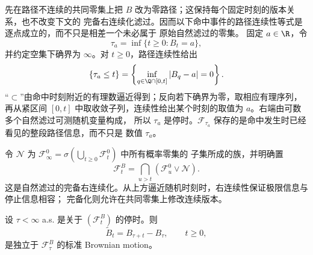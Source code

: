 \begin{example}
先在路径不连续的共同零集上把 $B$ 改为零路径；这保持每个固定时刻的版本关系，也不改变下文的
完备右连续化滤过。因而以下命中事件的路径连续性等式是逐点成立的，而不只是相差一个未必属于
原始自然滤过的零集。
固定 $a\in\R$，令
\[
 \tau_a=\inf\{t\ge0:B_t=a\},
\]
并约定空集下确界为 $\infty$。对 $t\ge0$，路径连续性给出
\[
 \{\tau_a\le t\}
 =\left\{\inf_{q\in\Q\cap[0,t]}|B_q-a|=0\right\}.
\]
“$\subset$”由命中时刻附近的有理数逼近得到；反向若下确界为零，取相应有理序列，再从紧区间
$[0,t]$ 中取收敛子列，连续性给出某个时刻的取值为 $a$。右端由可数多个自然滤过可测随机变量构成，
所以 $\tau_a$ 是停时。$\mathcal F_{\tau_a}$ 保存的是命中发生时已经看见的整段路径信息，而不只是
数值 $\tau_a$。
\end{example}

令 $\mathcal N$ 为 $\mathcal F_\infty^0=\sigma(\bigcup_{t\ge0}\mathcal F_t^0)$ 中所有概率零集的
子集所成的族，并明确置
\[
 \mathcal F_t^B=\bigcap_{u>t}(\mathcal F_u^0\vee\mathcal N).
\]
这是自然滤过的完备右连续化。从上方逼近随机时刻时，右连续性保证极限信息与停止信息相容；
完备化则允许在共同零集上修改连续版本。

\begin{theorem}\label{theorem:6-4-1-strong-markov}
设 $\tau<\infty$ a.s. 是关于 $(\mathcal F_t^B)$ 的停时。则
\[
 \widetilde B_t=B_{\tau+t}-B_\tau,\qquad t\ge0,
\]
是独立于 $\mathcal F_\tau^B$ 的标准 Brownian motion。
\end{theorem}

